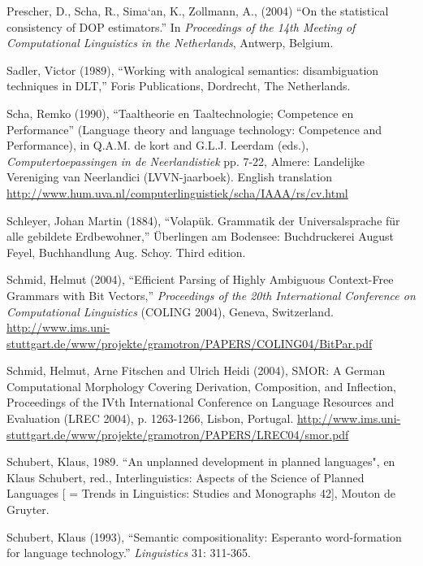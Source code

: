 \documentclass[10pt,a4paper]{article}
\begin{document}
\begin{description*}
\item[Prescher,] D., Scha, R., Sima`an, K., Zollmann, A., (2004) ``On the statistical
consistency of DOP estimators.'' In {\em Proceedings of the 14th Meeting of
Computational Linguistics in the Netherlands}, Antwerp, Belgium.

\item[Sadler,]  Victor (1989), ``Working with analogical semantics: disambiguation techniques in DLT,''
	Foris Publications, Dordrecht, The Netherlands.

\item[Scha,] Remko (1990), ``Taaltheorie en Taaltechnologie; Competence en
Performance'' (Language theory and language technology: Competence and
Performance), in Q.A.M. de kort and G.L.J. Leerdam (eds.), {\em
Computertoepassingen in de Neerlandistiek} pp. 7-22, Almere: Landelijke
Vereniging van Neerlandici (LVVN-jaarboek). English translation
\url{http://www.hum.uva.nl/computerlinguistiek/scha/IAAA/rs/cv.html}

\item[Schleyer,] Johan Martin (1884), ``Volap\"uk. Grammatik der Universalsprache f\"ur
alle gebildete Erdbewohner,'' \"Uberlingen am Bodensee: Buchdruckerei August
Feyel, Buchhandlung Aug. Schoy. Third edition.

\item[Schmid,] Helmut (2004), ``Efficient Parsing of Highly Ambiguous Context-Free
Grammars with Bit Vectors,'' {\em Proceedings of the 20th International Conference
on Computational Linguistics} (COLING 2004), Geneva, Switzerland.
\url{http://www.ims.uni-stuttgart.de/www/projekte/gramotron/PAPERS/COLING04/BitPar.pdf}

\item[Schmid,] Helmut, Arne Fitschen and Ulrich Heidi (2004), SMOR: A German
Computational Morphology Covering Derivation, Composition, and Inflection,
Proceedings of the IVth International Conference on Language Resources and
Evaluation (LREC 2004), p. 1263-1266, Lisbon, Portugal.
\url{http://www.ims.uni-stuttgart.de/www/projekte/gramotron/PAPERS/LREC04/smor.pdf}

\item[Schubert,] Klaus, 1989. ``An unplanned development in planned languages",
en Klaus Schubert, red., Interlinguistics: Aspects of the Science of Planned
Languages [ = Trends in Linguistics: Studies and Monographs 42], Mouton de
Gruyter.

\item[Schubert,] Klaus (1993), ``Semantic compositionality: Esperanto
word-formation for language technology.'' {\em Linguistics} 31: 311-365.


\end{description*}
\end{document}
